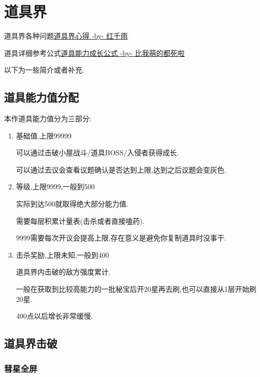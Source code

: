 \newpage

\section{道具界}

道具界各种问题\href{http://tieba.baidu.com/p/3730196003}{道具界心得 -by- 红千雨}

道具详细参考公式\href{http://tieba.baidu.com/f?kz=3834692385}{道具能力成长公式 -by- 比我萌的都死啦}

以下为一些简介或者补充.

	\subsection{道具能力值分配}
	
	本作道具能力值分为三部分:

	\begin{enumerate}

		\item 
		基础值,上限99999

		可以通过击破小屋战斗/道具BOSS/入侵者获得成长.

		可以通过去议会查看议题确认是否达到上限,达到之后议题会变灰色.

		\item
		等级,上限9999,一般到500

		实际到达500就取得绝大部分能力值.

		需要每层积累计量表(击杀或者直接嗑药).

		9999需要每次开议会提高上限,存在意义是避免你复制道具时没事干.

		\item
		击杀奖励,上限未知,一般到400

		道具界内击破的敌方强度累计.

		一般在获取到比较高能力的一批秘宝后开20星再去刷,也可以直接从1层开始刷20星.

		400点以后增长非常缓慢.

	\end{enumerate}
	
	\newpage

	\subsection{道具界击破}

		\subsubsection{彗星全屏}

